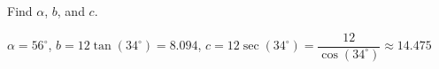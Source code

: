 {Find $\alpha$, $b$, and $c$.

\begin{center}
\end{center}}
{$\alpha = 56^{\circ}$, $b = 12 \tan(34^{\circ}) =  8.094$, $c = 12\sec(34^{\circ}) = \dfrac{12}{\cos(34^{\circ})} \approx 14.475$}